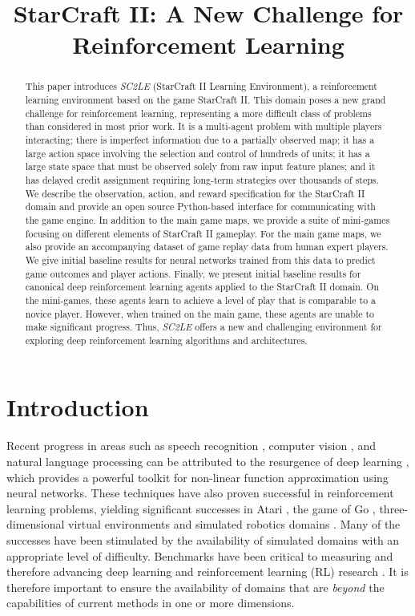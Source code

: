 \title{StarCraft II: A New Challenge for Reinforcement Learning}

\begin{abstract}
This paper introduces \emph{SC2LE} (StarCraft II Learning Environment), a reinforcement learning environment based on the game StarCraft II. This domain poses a new grand challenge for reinforcement learning, representing a more difficult class of problems than considered in most prior work. It is a multi-agent problem with multiple players interacting; there is imperfect information due to a partially observed map; it has a large action space involving the selection and control of hundreds of units; it has a large state space that must be observed solely from raw input feature planes; and it has delayed credit assignment requiring long-term strategies over thousands of steps. We describe the observation, action, and reward specification for the StarCraft II domain and provide an open source Python-based interface for communicating with the game engine. In addition to the main game maps, we provide a suite of mini-games focusing on different elements of StarCraft II gameplay. For the main game maps, we also provide an accompanying dataset of game replay data from human expert players. We give initial baseline results for neural networks trained from this data to predict game outcomes and player actions. Finally, we present initial baseline results for canonical deep reinforcement learning agents applied to the StarCraft II domain. On the mini-games, these agents learn to achieve a level of play that is comparable to a novice player. However, when trained on the main game, these agents are unable to make significant progress. Thus, \emph{SC2LE} offers a new and challenging environment for exploring deep reinforcement learning algorithms and architectures.
\end{abstract}

\section{Introduction}

Recent progress in areas such as speech recognition \cite{Dahl:2012}, computer vision \cite{Krizhevsky:2012}, and natural language processing \cite{Wu:2016google} can be attributed to the resurgence of deep learning \cite{Lecun:2015deep}, which provides a powerful toolkit for non-linear function approximation using neural networks. These techniques have also proven successful in reinforcement learning problems, yielding significant successes in Atari \cite{mnih2015human}, the game of Go \cite{silver2016mastering}, three-dimensional virtual environments \cite{Beattie:2016} and simulated robotics domains \cite{Levine:2016,Rusu:2016}. Many of the successes have been stimulated by the availability of simulated domains with an appropriate level of difficulty. Benchmarks have been critical to measuring and therefore advancing deep learning and reinforcement learning (RL) research \cite{bellemare2013arcade,mnih2015human,DBLP:journals/ijcv/RussakovskyDSKS15,Duan:2016}. It is therefore important to ensure the availability of domains that are \emph{beyond} the capabilities of current methods in one or more dimensions.

